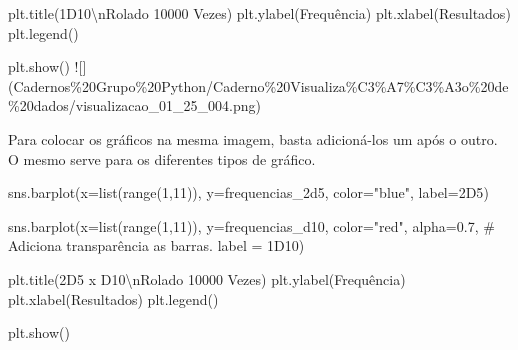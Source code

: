 \documentclass[
  letterpaper,
  DIV=11,
  numbers=noendperiod]{scrreprt}
\newenvironment{Shaded}{\begin{snugshade}}{\end{snugshade}}
\newcommand{\BuiltInTok}[1]{\textcolor[rgb]{0.00,0.23,0.31}{#1}}
\newcommand{\CharTok}[1]{\textcolor[rgb]{0.13,0.47,0.30}{#1}}
\newcommand{\CommentTok}[1]{\textcolor[rgb]{0.37,0.37,0.37}{#1}}
\newcommand{\DecValTok}[1]{\textcolor[rgb]{0.68,0.00,0.00}{#1}}
\newcommand{\ErrorTok}[1]{\textcolor[rgb]{0.68,0.00,0.00}{#1}}
\newcommand{\FloatTok}[1]{\textcolor[rgb]{0.68,0.00,0.00}{#1}}
\newcommand{\NormalTok}[1]{\textcolor[rgb]{0.00,0.23,0.31}{#1}}
\newcommand{\OperatorTok}[1]{\textcolor[rgb]{0.37,0.37,0.37}{#1}}
\newcommand{\StringTok}[1]{\textcolor[rgb]{0.13,0.47,0.30}{#1}}
\begin{document}
\begin{Shaded}
\begin{Highlighting}[]
\NormalTok{plt.title(}\StringTok{\textquotesingle{}1D10}\CharTok{\textbackslash{}n}\StringTok{Rolado 10000 Vezes\textquotesingle{}}\NormalTok{)        }
\NormalTok{plt.ylabel(}\StringTok{\textquotesingle{}Frequência\textquotesingle{}}\NormalTok{)                     }
\NormalTok{plt.xlabel(}\StringTok{\textquotesingle{}Resultados\textquotesingle{}}\NormalTok{)                     }
\NormalTok{plt.legend()                                 }

\NormalTok{plt.show()                                   }
\OperatorTok{!}\NormalTok{[](Cadernos}\OperatorTok{\%}\DecValTok{20}\ErrorTok{Grupo}\OperatorTok{\%}\DecValTok{20}\ErrorTok{Python}\OperatorTok{/}\NormalTok{Caderno}\OperatorTok{\%}\DecValTok{20}\ErrorTok{Visualiza}\OperatorTok{\%}\NormalTok{C3}\OperatorTok{\%}\NormalTok{A7}\OperatorTok{\%}\NormalTok{C3}\OperatorTok{\%}\NormalTok{A3o}\OperatorTok{\%}\DecValTok{20}\ErrorTok{de}\OperatorTok{\%}\DecValTok{20}\ErrorTok{dados}\OperatorTok{/}\NormalTok{visualizacao\_01\_25\_004.png)}

\NormalTok{Para colocar os gráficos na mesma imagem, basta adicioná}\OperatorTok{{-}}\NormalTok{los um após o outro. O mesmo serve para os diferentes tipos de gráfico.}

\NormalTok{sns.barplot(x}\OperatorTok{=}\BuiltInTok{list}\NormalTok{(}\BuiltInTok{range}\NormalTok{(}\DecValTok{1}\NormalTok{,}\DecValTok{11}\NormalTok{)),}
\NormalTok{            y}\OperatorTok{=}\NormalTok{frequencias\_2d5,              }
\NormalTok{            color}\OperatorTok{=}\StringTok{"blue"}\NormalTok{,                    }
\NormalTok{            label}\OperatorTok{=}\StringTok{\textquotesingle{}2D5\textquotesingle{}}\NormalTok{)                     }

\NormalTok{sns.barplot(x}\OperatorTok{=}\BuiltInTok{list}\NormalTok{(}\BuiltInTok{range}\NormalTok{(}\DecValTok{1}\NormalTok{,}\DecValTok{11}\NormalTok{)),}
\NormalTok{            y}\OperatorTok{=}\NormalTok{frequencias\_d10, }
\NormalTok{            color}\OperatorTok{=}\StringTok{"red"}\NormalTok{, }
\NormalTok{            alpha}\OperatorTok{=}\FloatTok{0.7}\NormalTok{,                      }\CommentTok{\# Adiciona transparência as barras.}
\NormalTok{            label }\OperatorTok{=} \StringTok{\textquotesingle{}1D10\textquotesingle{}}\NormalTok{)}

\NormalTok{plt.title(}\StringTok{\textquotesingle{}2D5 x D10}\CharTok{\textbackslash{}n}\StringTok{Rolado 10000 Vezes\textquotesingle{}}\NormalTok{)  }
\NormalTok{plt.ylabel(}\StringTok{\textquotesingle{}Frequência\textquotesingle{}}\NormalTok{)                     }
\NormalTok{plt.xlabel(}\StringTok{\textquotesingle{}Resultados\textquotesingle{}}\NormalTok{)                   }
\NormalTok{plt.legend()                                 }

\NormalTok{plt.show()}
\end{Highlighting}
\end{Shaded}
\end{document}
